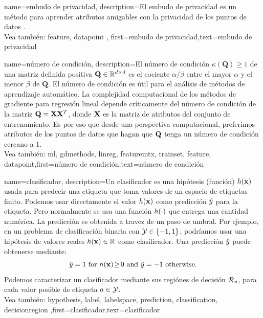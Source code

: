 {name={embudo de privacidad},
description={El embudo de privacidad es un método para aprender atributos 
	amigables con la privacidad de los puntos de datos \cite{PrivacyFunnel}.
	\\
		Vea también: \gls{feature}, \gls{datapoint} },
first={embudo de privacidad},text={embudo de privacidad} 
}




{
	name={número de condición},
	description={El número de condición $\kappa(\mathbf{Q}) \geq 1$ de una 
		matriz definida positiva $\mathbf{Q} \in \mathbb{R}^{d \times d}$ es el cociente 
		$\alpha /\beta  $ entre el 
		mayor $\alpha$ y el menor $\beta$ de 
		$\mathbf{Q}$. El número de condición es útil para el análisis de métodos de aprendizaje automático. 
		La complejidad computacional de los métodos de gradiente para regresión lineal depende críticamente del número 
		de condición de la matriz $\mathbf{Q} = {\bf X} {\bf X}^{T}$, donde ${\bf X}$  es la matriz de atributos 
		del conjunto de entrenamiento. Es por eso que desde una perspectiva computacional, preferimos atributos de los 
		puntos de datos que hagan que $\mathbf{Q}$ tenga un número de condición cercano a $1$.
		\\
		Vea también: \gls{ml}, \gls{gdmethods}, \gls{linreg}, \gls{featuremtx}, \gls{trainset}, \gls{feature}, \gls{datapoint}},first={número de condición},text={número de condición} 
}

{
	name={clasificador},
	description={Un clasificador es una hipótesis (función) $h({\bf x})$ 
		usada para predecir una etiqueta que toma valores de un espacio de etiquetas finito. Podemos usar directamente 
		el valor $h({\bf x})$ como predicción $\hat{y}$ para 
		la etiqueta. Pero normalmente se usa una función $h(\cdot)$ que entrega 
		una cantidad numérica. La predicción es obtenida a travez de un paso de umbral. 
		Por ejemplo, en un problema de clasificación binaria con \label{labelspace} $\mathcal{Y} \in  \{ -1,1\}$, 
		podríamos usar una hipótesis de valores reales $h({\bf x}) \in \mathbb{R}$ 
		como clasificador. Una predicción $\hat{y}$ puede obtenerse mediante:  
		 \begin{equation} 
		 	\label{equ_def_threshold_bin_classifier_dict}
		 	\hat{y} =1   \mbox{ for } h({\bf x})\!\geq\!0 \mbox{ and } 	\hat{y} =-1  \mbox{ otherwise.}
	 		\end{equation}
		Podemos caracterizar un clasificador mediante sus regiónes de decisión $\mathcal{R}_{a}$, para 
		cada valor posible de etiqueta $a \in \mathcal{Y}$.
		\\
		Vea también: \gls{hypothesis}, \gls{label}, \gls{labelspace}, \gls{prediction}, \gls{classification}, \gls{decisionregion}  },first={clasificador},text={clasificador} 
}

